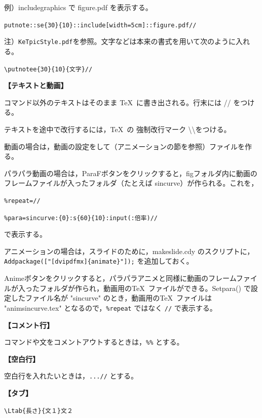\documentclass[papersize,a4paper,12pt,uplatex]{jsarticle}
\begin{document}
 例）includegraphics で figure.pdf を表示する。
 
\hspace{10mm} \verb|putnote::se{30}{10}::include[width=5cm]::figure.pdf//|
 
 
 注）\verb|KeTpicStyle.pdf|を参照。文字などは本来の書式を用いて次のように入れる。
 
\hspace{10mm} \verb|\putnotee{30}{10}{文字}//|

\vspace{\baselineskip}
{\bf 【テキストと動画】}
 
コマンド以外のテキストはそのまま \TeX\ に書き出される。行末には // をつける。

テキストを途中で改行するには，\TeX\ の 強制改行マーク \textbackslash \textbackslash をつける。

動画の場合は，動画の設定をして（アニメーションの節を参照）ファイルを作る。

パラパラ動画の場合は，ParaFボタンをクリックすると，figフォルダ内に動画のフレームファイルが入ったフォルダ（たとえば sincurve）が作られる。これを，

\hspace{10mm} \verb|%repeat=//|
 
\hspace{10mm} \verb|%para=sincurve:{0}:s{60}{10}:input(:倍率)//|

で表示する。

アニメーションの場合は，スライドのために，makeslide.cdy のスクリプトに， \verb|Addpackage(["[dvipdfmx]{animate}"]);| を追加しておく。

Animeボタンをクリックすると，パラパラアニメと同様に動画のフレームファイルが入ったフォルダが作られ，動画用の\TeX\ ファイルができる。Setpara() で設定したファイル名が "sincurve" のとき，動画用の\TeX\ ファイルは "animsincurve.tex" となるので，\verb|%repeat| ではなく \verb|//| で表示する。

 
\vspace{\baselineskip}
{\bf 【コメント行】} 

 コマンドや文をコメントアウトするときは，\verb|%%| とする。

\vspace{\baselineskip}
{\bf 【空白行】}

空白行を入れたいときは，\verb|...//| とする。

\vspace{\baselineskip}
{\bf 【タブ】}

\hspace{10mm}\verb|\Ltab{長さ}{文１}文２|
\end{document}
